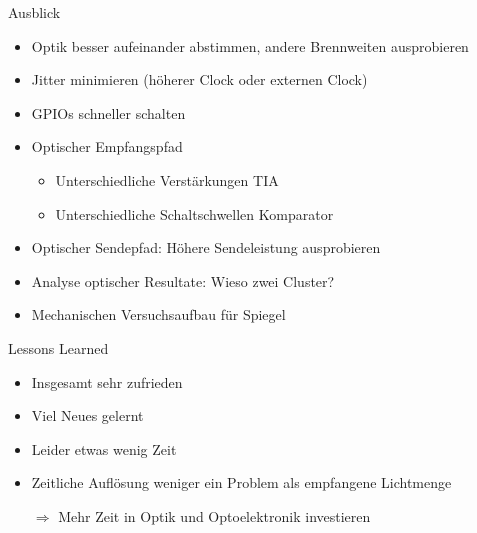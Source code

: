 \begin{frame}{Ausblick}
    \begin{itemize}
        \item Optik besser aufeinander abstimmen, andere Brennweiten ausprobieren
        \item Jitter minimieren (höherer Clock oder externen Clock)
        \item GPIOs schneller schalten
        \item Optischer Empfangspfad
        \begin{itemize}
            \item Unterschiedliche Verstärkungen TIA
            \item Unterschiedliche Schaltschwellen Komparator
        \end{itemize}
        \item Optischer Sendepfad: Höhere Sendeleistung ausprobieren
        \item Analyse optischer Resultate: Wieso zwei Cluster?
        \item Mechanischen Versuchsaufbau für Spiegel
    \end{itemize}
\end{frame}

\begin{frame}{Lessons Learned}
    \begin{itemize}
        \item Insgesamt sehr zufrieden
        \item Viel Neues gelernt
        \item Leider etwas wenig Zeit
        \item Zeitliche Auflösung weniger ein Problem als empfangene Lichtmenge
        \item[$\Rightarrow$] Mehr Zeit in Optik und Optoelektronik investieren
    \end{itemize}
\end{frame}
